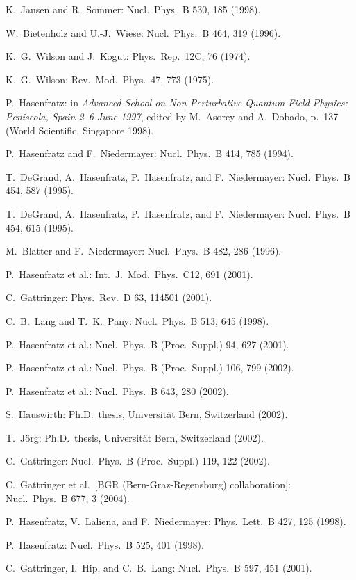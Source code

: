 \begin{enumerate}[label={[\arabic*]}]
  \item K.~Jansen and R.~Sommer: Nucl.\ Phys.\ B 530, 185 (1998).
  \item W.~Bietenholz and U.-J.~Wiese: Nucl.\ Phys.\ B 464, 319 (1996).
  \item K.~G.~Wilson and J.~Kogut: Phys.\ Rep.\ 12C, 76 (1974).
  \item K.~G.~Wilson: Rev.\ Mod.\ Phys.\ 47, 773 (1975).
  \item P.~Hasenfratz: in \emph{Advanced School on Non-Perturbative Quantum
        Field Physics: Peniscola, Spain 2--6 June 1997}, edited by
        M.~Asorey and A.~Dobado, p.~137 (World Scientific, Singapore 1998).
  \item P.~Hasenfratz and F.~Niedermayer: Nucl.\ Phys.\ B 414, 785 (1994).
  \item T.~DeGrand, A.~Hasenfratz, P.~Hasenfratz, and F.~Niedermayer: Nucl.\ Phys.\ B 454, 587 (1995).
  \item T.~DeGrand, A.~Hasenfratz, P.~Hasenfratz, and F.~Niedermayer: Nucl.\ Phys.\ B 454, 615 (1995).
  \item M.~Blatter and F.~Niedermayer: Nucl.\ Phys.\ B 482, 286 (1996).
  \item P.~Hasenfratz et al.: Int.\ J.\ Mod.\ Phys.\ C12, 691 (2001).
  \item C.~Gattringer: Phys.\ Rev.\ D 63, 114501 (2001).
  \item C.~B.~Lang and T.~K.~Pany: Nucl.\ Phys.\ B 513, 645 (1998).
  \item P.~Hasenfratz et al.: Nucl.\ Phys.\ B (Proc.\ Suppl.) 94, 627 (2001).
  \item P.~Hasenfratz et al.: Nucl.\ Phys.\ B (Proc.\ Suppl.) 106, 799 (2002).
  \item P.~Hasenfratz et al.: Nucl.\ Phys.\ B 643, 280 (2002).
  \item S.~Hauswirth: Ph.D.\ thesis, Universit\"at Bern, Switzerland (2002).
  \item T.~J\"org: Ph.D.\ thesis, Universit\"at Bern, Switzerland (2002).
  \item C.~Gattringer: Nucl.\ Phys.\ B (Proc.\ Suppl.) 119, 122 (2002).
  \item C.~Gattringer et al.\ [BGR (Bern-Graz-Regensburg) collaboration]: Nucl.\ Phys.\ B 677, 3 (2004).
  \item P.~Hasenfratz, V.~Laliena, and F.~Niedermayer: Phys.\ Lett.\ B 427, 125 (1998).
  \item P.~Hasenfratz: Nucl.\ Phys.\ B 525, 401 (1998).
  \item C.~Gattringer, I.~Hip, and C.~B.~Lang: Nucl.\ Phys.\ B 597, 451 (2001).

\end{enumerate}
